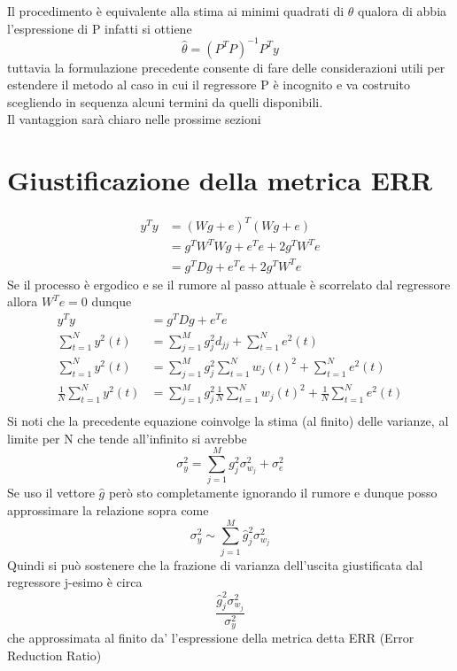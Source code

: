 \documentclass[10pt,a4paper]{book}
\begin{document}
Il procedimento è equivalente alla stima ai minimi quadrati di $\theta$ qualora di abbia l'espressione di P
infatti si ottiene
\begin{equation}
\hat{\theta}=(P^TP)^{-1}P^Ty
\end{equation}
tuttavia la formulazione precedente consente di fare delle considerazioni utili per estendere il metodo al caso in cui il regressore P è incognito e va costruito scegliendo in sequenza alcuni termini da quelli disponibili.\\
Il vantaggion sarà chiaro nelle prossime sezioni
\section{Giustificazione della metrica ERR}
\begin{align*}
y^Ty&=(Wg+e)^T(Wg+e)\\
&=g^TW^TWg+e^Te+2g^TW^Te\\
&=g^TDg+e^Te+2g^TW^Te
\end{align*}
Se il processo è ergodico e se il rumore al passo attuale è scorrelato dal regressore allora $W^Te=0$ dunque
\begin{align*}
y^Ty&=g^TDg+e^Te\\
\sum_{t=1}^Ny^2(t)&=\sum_{j=1}^M g_j^2 d_{jj}+\sum_{t=1}^Ne^2(t) \\
\sum_{t=1}^Ny^2(t)&=\sum_{j=1}^M g_j^2 \sum_{t=1}^N w_j(t)^2+\sum_{t=1}^Ne^2(t) \\
\frac{1}{N}\sum_{t=1}^Ny^2(t)&=\sum_{j=1}^M g_j^2 \frac{1}{N}\sum_{t=1}^N w_j(t)^2+\frac{1}{N}\sum_{t=1}^Ne^2(t) \\
\end{align*}
Si noti che la precedente equazione coinvolge la stima (al finito) delle varianze, al limite  per N che tende all'infinito si avrebbe
\begin{equation}
\sigma_y^2=\sum_{j=1}^M g_j^2 \sigma_{w_j}^2+\sigma_e^2 
\end{equation}
Se uso il vettore $\hat{g}$ però sto completamente ignorando il rumore e dunque posso approssimare la relazione sopra come
\begin{equation}
\sigma_y^2\sim \sum_{j=1}^M \hat{g}_j^2 \sigma_{w_j}^2
\end{equation}
Quindi si può sostenere che la frazione di varianza dell'uscita giustificata dal regressore j-esimo è circa
\begin{equation}
\frac{\hat{g}_j^2 \sigma_{w_j}^2}{\sigma_y^2}
\end{equation}
che approssimata al finito da' l'espressione della metrica detta ERR (Error Reduction Ratio)
\end{document}
